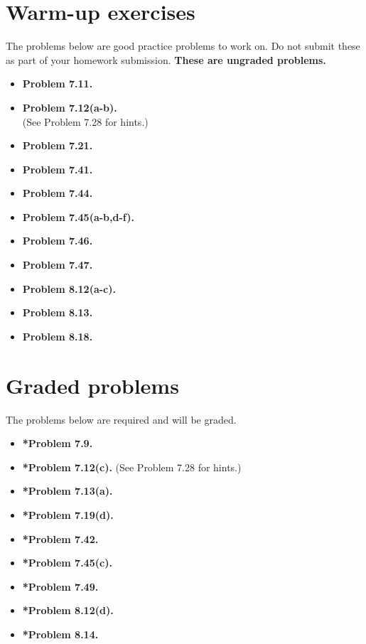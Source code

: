 \documentclass[11pt]{article}
\begin{document}
\vspace{0.2in}


\newpage
\section*{Warm-up exercises}
The problems below are good practice problems to work on.
Do not submit these as part of your homework submission.
\textbf{These are ungraded problems.}

\begin{multicols}{2}
\begin{itemize}

\item \textbf{Problem 7.11.}
\item \textbf{Problem 7.12(a-b).}\\(See Problem 7.28 for hints.)
\item \textbf{Problem 7.21.}
\item \textbf{Problem 7.41.}
\item \textbf{Problem 7.44.}
\item \textbf{Problem 7.45(a-b,d-f).}
\item \textbf{Problem 7.46.}
\item \textbf{Problem 7.47.}
\item \textbf{Problem 8.12(a-c).}
\item \textbf{Problem 8.13.}
\item \textbf{Problem 8.18.}

\end{itemize}
\end{multicols}

\section*{Graded problems}
The problems below are required and will be graded.
\begin{itemize}

\item \textbf{*Problem 7.9.}
\item \textbf{*Problem 7.12(c).} (See Problem 7.28 for hints.)
\item \textbf{*Problem 7.13(a).}
\item \textbf{*Problem 7.19(d).}
\item \textbf{*Problem 7.42.}
\item \textbf{*Problem 7.45(c).}
\item \textbf{*Problem 7.49.}
\item \textbf{*Problem 8.12(d).}
\item \textbf{*Problem 8.14.}

\end{itemize}
\end{document}
